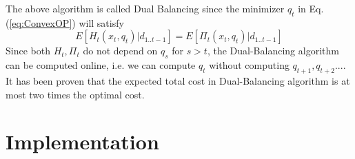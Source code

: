 \documentclass[twoside]{article}
\begin{document}
\begin{multicols}{2}
    The above algorithm is called Dual Balancing since the minimizer $q_t$ in Eq. (\ref{eq:ConvexOP}) will satisfy
    \begin{equation}\label{eq:DB}
        E[H_t(x_t,q_t)| d_{1..t-1}] = E[\Pi_t(x_t,q_t)| d_{1..t-1}]
        \end{equation}
      Since both $H_t,\Pi_t$ do not depend on $q_s$ for $s>t$, the Dual-Balancing algorithm can be computed online, i.e. we can compute $q_t$ without computing $q_{t+1}, q_{t+2} ... $. It has been proven that the expected total cost in Dual-Balancing algorithm is at most two times the optimal cost\cite{CLAcha2}.


\section{Implementation}



\end{multicols}
\end{document}
